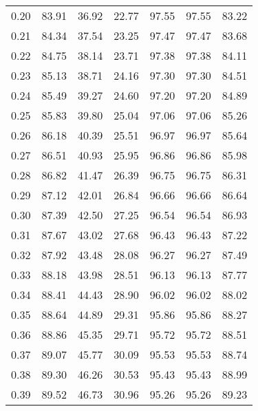 \begin{tabular}{|c|c|c|c|c|c|c|}
      0.20 &     83.91 &     36.92 &      22.77 &   97.55 &      97.55 &         83.22 \\
      0.21 &     84.34 &     37.54 &      23.25 &   97.47 &      97.47 &         83.68 \\
      0.22 &     84.75 &     38.14 &      23.71 &   97.38 &      97.38 &         84.11 \\
      0.23 &     85.13 &     38.71 &      24.16 &   97.30 &      97.30 &         84.51 \\
      0.24 &     85.49 &     39.27 &      24.60 &   97.20 &      97.20 &         84.89 \\
      0.25 &     85.83 &     39.80 &      25.04 &   97.06 &      97.06 &         85.26 \\
      0.26 &     86.18 &     40.39 &      25.51 &   96.97 &      96.97 &         85.64 \\
      0.27 &     86.51 &     40.93 &      25.95 &   96.86 &      96.86 &         85.98 \\
      0.28 &     86.82 &     41.47 &      26.39 &   96.75 &      96.75 &         86.31 \\
      0.29 &     87.12 &     42.01 &      26.84 &   96.66 &      96.66 &         86.64 \\
      0.30 &     87.39 &     42.50 &      27.25 &   96.54 &      96.54 &         86.93 \\
      0.31 &     87.67 &     43.02 &      27.68 &   96.43 &      96.43 &         87.22 \\
      0.32 &     87.92 &     43.48 &      28.08 &   96.27 &      96.27 &         87.49 \\
      0.33 &     88.18 &     43.98 &      28.51 &   96.13 &      96.13 &         87.77 \\
      0.34 &     88.41 &     44.43 &      28.90 &   96.02 &      96.02 &         88.02 \\
      0.35 &     88.64 &     44.89 &      29.31 &   95.86 &      95.86 &         88.27 \\
      0.36 &     88.86 &     45.35 &      29.71 &   95.72 &      95.72 &         88.51 \\
      0.37 &     89.07 &     45.77 &      30.09 &   95.53 &      95.53 &         88.74 \\
      0.38 &     89.30 &     46.26 &      30.53 &   95.43 &      95.43 &         88.99 \\
      0.39 &     89.52 &     46.73 &      30.96 &   95.26 &      95.26 &         89.23 \\

\end{tabular}
